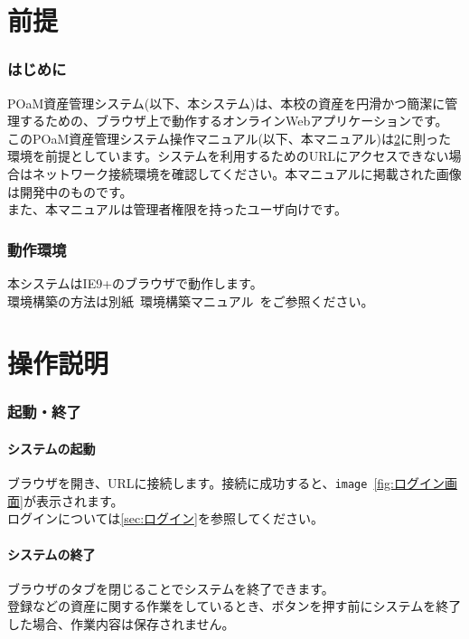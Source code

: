 \documentclass[11ptm]{jsarticle}
\begin{document}
\part{前提}
\hrulefill


\section{はじめに}
\label{sec:はじめに}
POaM資産管理システム(以下、本システム)は、本校の資産を円滑かつ簡潔に管理するための、ブラウザ上で動作するオンラインWebアプリケーションです。\\
このPOaM資産管理システム操作マニュアル(以下、本マニュアル)は\ref{sec:動作環境}に則った環境を前提としています。システムを利用するためのURLにアクセスできない場合はネットワーク接続環境を確認してください。本マニュアルに掲載された画像は開発中のものです。\\
また、本マニュアルは管理者権限を持ったユーザ向けです。


\section{動作環境}
\label{sec:動作環境}
本システムはIE9+のブラウザで動作します。\\
環境構築の方法は別紙\ 環境構築マニュアル\ をご参照ください。


\clearpage
\part{操作説明}
\hrulefill


\section{起動・終了}
\label{sec:起動・終了}

\subsection{システムの起動}
\label{sec:システムの起動}
ブラウザを開き、URLに接続します。接続に成功すると、{\tt image}\ \ref{fig:ログイン画面}が表示されます。\\
ログインについては\ref{sec:ログイン}を参照してください。

\subsection{システムの終了}
\label{sec:システムの終了}
ブラウザのタブを閉じることでシステムを終了できます。\\
登録などの資産に関する作業をしているとき、ボタンを押す前にシステムを終了した場合、作業内容は保存されません。
\end{document}
